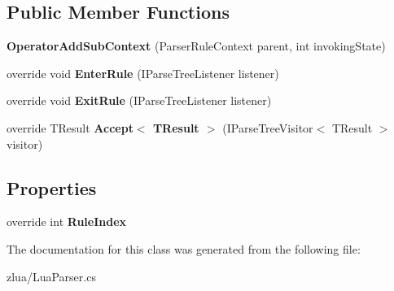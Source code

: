 \subsection*{Public Member Functions}
\begin{DoxyCompactItemize}
\item 
\mbox{\label{classzlua_1_1_lua_parser_1_1_operator_add_sub_context_a526dce96aa19dedff4ca2027e1e751db}} 
{\bfseries Operator\+Add\+Sub\+Context} (Parser\+Rule\+Context parent, int invoking\+State)
\item 
\mbox{\label{classzlua_1_1_lua_parser_1_1_operator_add_sub_context_a5f03dd13a52b2ab3659ebe08b292ec11}} 
override void {\bfseries Enter\+Rule} (I\+Parse\+Tree\+Listener listener)
\item 
\mbox{\label{classzlua_1_1_lua_parser_1_1_operator_add_sub_context_ae1f109893c9f86e56deb0f26af8c22b7}} 
override void {\bfseries Exit\+Rule} (I\+Parse\+Tree\+Listener listener)
\item 
\mbox{\label{classzlua_1_1_lua_parser_1_1_operator_add_sub_context_a6ae62688051120473cea42bf94fe301a}} 
override T\+Result {\bfseries Accept$<$ T\+Result $>$} (I\+Parse\+Tree\+Visitor$<$ T\+Result $>$ visitor)
\end{DoxyCompactItemize}
\subsection*{Properties}
\begin{DoxyCompactItemize}
\item 
\mbox{\label{classzlua_1_1_lua_parser_1_1_operator_add_sub_context_a76c57624b847a7e56ea0df8041936dd2}} 
override int {\bfseries Rule\+Index}
\end{DoxyCompactItemize}


The documentation for this class was generated from the following file\+:\begin{DoxyCompactItemize}
\item 
zlua/Lua\+Parser.\+cs\end{DoxyCompactItemize}
